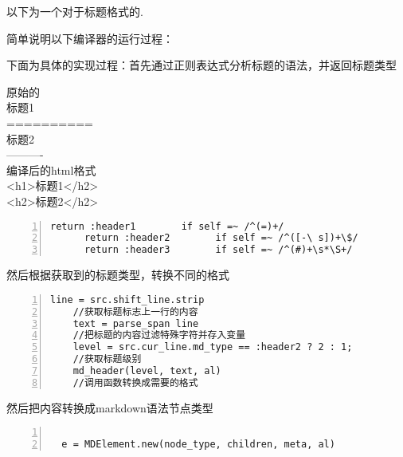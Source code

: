 以下为一个对于标题格式的.

简单说明以下编译器的运行过程：

下面为具体的实现过程：首先通过正则表达式分析标题的语法，并返回标题类型

\begin{bframe}
  原始的\\
         标题1\\
         ==========\\
         标题2\\
         ----------  \\
 编译后的html格式\\
        <h1>标题1</h2>\\
        <h2>标题2</h2>\\
\end{bframe}



\begin{lstlisting}[language={[ANSI]C}, numbers=left, numberstyle=\tiny, keywordstyle=\color{blue!70}, commentstyle=\color{red!50!green!50!blue!50},rulesepcolor=\color{red!20!green!20!blue!20}]
      return :header1        if self =~ /^(=)+/
      return :header2        if self =~ /^([-\ s])+\$/
      return :header3        if self =~ /^(#)+\s*\S+/

\end{lstlisting}

然后根据获取到的标题类型，转换不同的格式

\begin{lstlisting}[language={[ANSI]C}, numbers=left, numberstyle=\tiny, keywordstyle=\color{blue!70}, commentstyle=\color{red!50!green!50!blue!50}, rulesepcolor=\color{red!20!green!20!blue!20}]
    line = src.shift_line.strip
    //获取标题标志上一行的内容
    text = parse_span line
    //把标题的内容过滤特殊字符并存入变量
    level = src.cur_line.md_type == :header2 ? 2 : 1;
    //获取标题级别
    md_header(level, text, al)
    //调用函数转换成需要的格式

\end{lstlisting}

然后把内容转换成markdown语法节点类型

\begin{lstlisting}[language={[ANSI]C}, numbers=left, numberstyle=\tiny, keywordstyle=\color{blue!70}, commentstyle=\color{red!50!green!50!blue!50}, rulesepcolor=\color{red!20!green!20!blue!20}]

  e = MDElement.new(node_type, children, meta, al)

\end{lstlisting}

